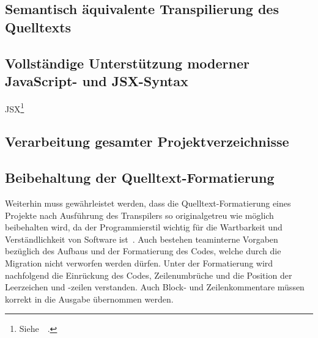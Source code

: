 \subsection{Semantisch äquivalente Transpilierung des Quelltexts}
\label{subsection:requirement:semantic-equivalence}

\subsection{Vollständige Unterstützung moderner JavaScript- und JSX-Syntax}
\label{subsection:requirement:modern-js-support}

JSX\footnote{Siehe~~\autocite{SOFTWARE:JSX}.}

\subsection{Verarbeitung gesamter Projektverzeichnisse}
\label{subsection:requirement:batch-processing}



\subsection{Beibehaltung der Quelltext-Formatierung}
\label{subsection:requirement:format}

Weiterhin muss gewährleistet werden, dass die Quelltext-Formatierung eines Projekte nach Ausführung des Transpilers so originalgetreu wie möglich beibehalten wird, da der Programmierstil wichtig für die Wartbarkeit und Verständlichkeit von Software ist~\autocite[146]{KERNIGHAN:1982}. Auch bestehen teaminterne Vorgaben bezüglich des Aufbaus und der Formatierung des Codes, welche durch die Migration nicht verworfen werden dürfen. Unter der Formatierung wird nachfolgend die Einrückung des Codes, Zeilenumbrüche und die Position der Leerzeichen und -zeilen verstanden. Auch Block- und Zeilenkommentare müssen korrekt in die Ausgabe übernommen werden.
